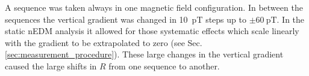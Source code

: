 


A sequence was taken always in one magnetic field configuration.
In between the sequences the vertical gradient was changed in \SI{10}{\pico\tesla} steps up to $\pm \SI{60}{\pico\tesla}$. In the static nEDM analysis it allowed for those systematic effects which scale linearly with the gradient to be extrapolated to zero (see Sec.\,\ref{sec:measurement_procedure}). These large changes in the vertical gradient caused the large shifts in $R$ from one sequence to another.



